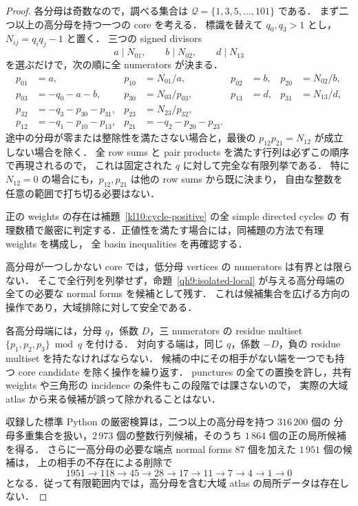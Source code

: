 \begin{proof}
各分母は奇数なので，調べる集合は
$\mathcal Q=\{1,3,5,\ldots,101\}$ である．
まず二つ以上の高分母を持つ一つの core を考える．
標識を替えて $q_0,q_3>1$ とし，$N_{ij}=q_iq_j-1$ と置く．
三つの signed divisors
\[
 a\mid N_{01},\qquad b\mid N_{02},\qquad d\mid N_{13}
\]
を選ぶだけで，次の順に全 numerators が決まる．
\begin{align*}
 p_{01}&=a,&p_{10}&=N_{01}/a,&
 p_{02}&=b,&p_{20}&=N_{02}/b,\\
 p_{03}&=-q_0-a-b,&p_{30}&=N_{03}/p_{03},&
 p_{13}&=d,&p_{31}&=N_{13}/d,\\
 p_{32}&=-q_3-p_{30}-p_{31},&p_{23}&=N_{23}/p_{32},\\
 p_{12}&=-q_1-p_{10}-p_{13},&p_{21}&=-q_2-p_{20}-p_{23}.
\end{align*}
途中の分母が零または整除性を満たさない場合と，最後の
$p_{12}p_{21}=N_{12}$ が成立しない場合を除く．
全 row sums と pair products を満たす行列は必ずこの順序で再現されるので，
これは固定された $q$ に対して完全な有限列挙である．
特に $N_{12}=0$ の場合にも，$p_{12},p_{21}$ は他の row sums から既に決まり，
自由な整数を任意の範囲で打ち切る必要はない．

正の weights の存在は補題~\ref{kl10:cycle-positive} の全 simple directed cycles の
有理数積で厳密に判定する．正値性を満たす場合には，同補題の方法で有理 weights を構成し，
全 basin inequalities を再確認する．

高分母が一つしかない core では，低分母 vertices の numerators は有界とは限らない．
そこで全行列を列挙せず，命題~\ref{qh9:isolated-local} が与える高分母端の
全ての必要な normal forms を候補として残す．
これは候補集合を広げる方向の操作であり，大域排除に対して安全である．

各高分母端には，分母 $q$，係数 $D$，三 numerators の residue multiset
$\{p_1,p_2,p_3\}\bmod q$ を付ける．
対向する端は，同じ $q$，係数 $-D$，負の residue multiset を持たなければならない．
候補の中にその相手がない端を一つでも持つ core candidate を除く操作を繰り返す．
punctures の全ての置換を許し，共有 weights や三角形の incidence の条件もこの段階では課さないので，
実際の大域 atlas から来る候補が誤って除かれることはない．

収録した標準 Python の厳密検算は，二つ以上の高分母を持つ $316\,200$ 個の
分母多重集合を扱い，$2\,973$ 個の整数行列候補，そのうち $1\,864$ 個の正の局所候補を得る．
さらに一高分母の必要な端点 normal forms $87$ 個を加えた $1\,951$ 個の候補は，
上の相手の不存在による削除で
\[
1951\longrightarrow118\longrightarrow45\longrightarrow28\longrightarrow17
\longrightarrow11\longrightarrow7\longrightarrow4\longrightarrow1\longrightarrow0
\]
となる．従って有限範囲内では，高分母を含む大域 atlas の局所データは存在しない．
\end{proof}

